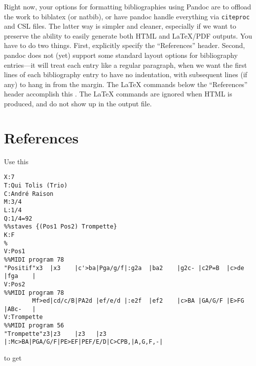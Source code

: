 \documentclass[]{article}
\begin{document}
Right now, your options for formatting bibliographies using Pandoc are
to offload the work to biblatex (or natbib), or have pandoc handle
everything via \texttt{citeproc} and CSL files. The latter way is
simpler and cleaner, especially if we want to preserve the ability to
easily generate both HTML and LaTeX/PDF outputs. You have to do two
things. First, explicitly specify the ``References'' header. Second,
pandoc does not (yet) support some standard layout options for
bibliography entries---it will treat each entry like a regular
paragraph, when we want the first lines of each bibliography entry to
have no indentation, with subsequent lines (if any) to hang in from the
margin. The LaTeX commands below the ``References'' header accomplish
this . The LaTeX commands are ignored when HTML is produced, and do not
show up in the output file.

\section{References}\label{references}

\setlength{\parindent}{-0.2in} \setlength{\leftskip}{0.2in}
\setlength{\parskip}{8pt} \vspace*{-0.2in} \noindent

Use this

\begin{verbatim}
X:7
T:Qui Tolis (Trio)
C:André Raison
M:3/4
L:1/4
Q:1/4=92
%%staves {(Pos1 Pos2) Trompette}   
K:F
%  
V:Pos1
%%MIDI program 78
"Positif"x3  |x3    |c'>ba|Pga/g/f|:g2a  |ba2    |g2c- |c2P=B  |c>de  |fga    |
V:Pos2
%%MIDI program 78
        Mf>ed|cd/c/B|PA2d |ef/e/d |:e2f  |ef2    |c>BA |GA/G/F |E>FG  |ABc-   |
V:Trompette
%%MIDI program 56
"Trompette"z3|z3    |z3   |z3     |:Mc>BA|PGA/G/F|PE>EF|PEF/E/D|C>CPB,|A,G,F,-|
\end{verbatim}

to get
\end{document}
